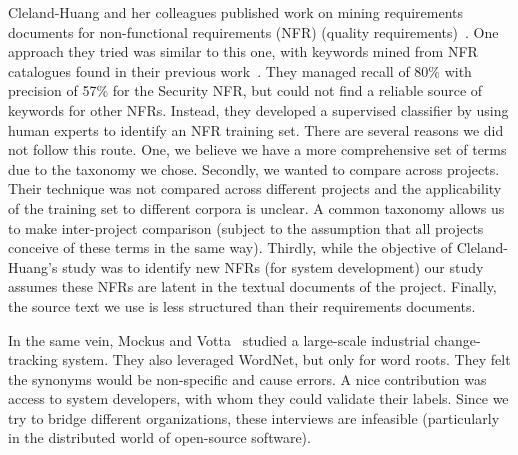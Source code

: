 \documentclass{acm_proc_article-sp}
\begin{document}
Cleland-Huang and her colleagues published work on mining requirements documents for non-functional requirements (NFR) (quality requirements)~\cite{Cleland-Huang2006}. One approach they tried was similar to this one, with keywords mined from NFR catalogues found in their previous work~\cite{chung99}. They managed recall of 80\% with precision of 57\% for the Security NFR, but could not find a reliable source of keywords for other NFRs. Instead, they developed a supervised classifier by using human experts to identify an NFR training set. There are several reasons we did not follow this route. One, we believe we have a more comprehensive set of terms due to the taxonomy we chose. Secondly, we wanted to compare across projects. Their technique was not compared across different projects and the applicability of the training set to different corpora is unclear. A common taxonomy allows us to make inter-project comparison (subject to the assumption that all projects conceive of these terms in the same way). Thirdly, while the objective of Cleland-Huang's study was to identify new NFRs (for system development) our study assumes these NFRs are latent in the textual documents of the project. Finally, the source text we use is less structured than their requirements documents.

In the same vein, Mockus and Votta~\cite{Mockus00} studied a large-scale industrial change-tracking system. They also leveraged WordNet, but only for word roots. They felt the synonyms would be non-specific and cause errors. A nice contribution was access to system developers, with whom they could validate their labels. Since we try to bridge different organizations, these interviews are infeasible (particularly in the distributed world of open-source software).
\end{document}
